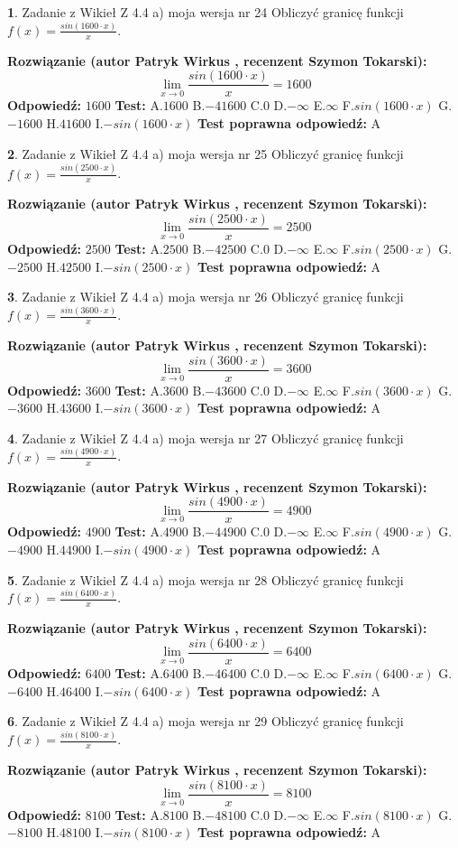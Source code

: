 \documentclass[12pt, a4paper]{article}
\theoremstyle{definition} %
\newtheorem{zad}{}
\newcommand{\zadStart}[1]{\begin{zad}#1\newline}
\newcommand{\zadStop}{\end{zad}}
\newcommand{\rozwStart}[2]{\noindent \textbf{Rozwiązanie (autor #1 , recenzent #2): }\newline}
\newcommand{\rozwStop}{\newline}
\newcommand{\odpStart}{\noindent \textbf{Odpowiedź:}\newline}
\newcommand{\odpStop}{\newline}
\newcommand{\testStart}{\noindent \textbf{Test:}\newline}
\newcommand{\testStop}{\newline}
\newcommand{\kluczStart}{\noindent \textbf{Test poprawna odpowiedź:}\newline}
\newcommand{\kluczStop}{\newline}
\begin{document}
\zadStart{Zadanie z Wikieł Z 4.4 a) moja wersja nr 24}
Obliczyć granicę funkcji $f(x)=\frac{sin(1600\cdot x)}{x}$.
\zadStop
\rozwStart{Patryk Wirkus}{Szymon Tokarski}
$$\lim\limits_{x\to 0}\frac{sin(1600\cdot x)}{x}=
1600$$
\rozwStop
\odpStart
$1600$
\odpStop
\testStart
A.$1600$
B.$-41600$
C.$0$
D.$-\infty$
E.$\infty$
F.$sin(1600\cdot x)$
G.$-1600$
H.$41600$
I.$-sin(1600\cdot x)$
\testStop
\kluczStart
A
\kluczStop



\zadStart{Zadanie z Wikieł Z 4.4 a) moja wersja nr 25}
Obliczyć granicę funkcji $f(x)=\frac{sin(2500\cdot x)}{x}$.
\zadStop
\rozwStart{Patryk Wirkus}{Szymon Tokarski}
$$\lim\limits_{x\to 0}\frac{sin(2500\cdot x)}{x}=
2500$$
\rozwStop
\odpStart
$2500$
\odpStop
\testStart
A.$2500$
B.$-42500$
C.$0$
D.$-\infty$
E.$\infty$
F.$sin(2500\cdot x)$
G.$-2500$
H.$42500$
I.$-sin(2500\cdot x)$
\testStop
\kluczStart
A
\kluczStop



\zadStart{Zadanie z Wikieł Z 4.4 a) moja wersja nr 26}
Obliczyć granicę funkcji $f(x)=\frac{sin(3600\cdot x)}{x}$.
\zadStop
\rozwStart{Patryk Wirkus}{Szymon Tokarski}
$$\lim\limits_{x\to 0}\frac{sin(3600\cdot x)}{x}=
3600$$
\rozwStop
\odpStart
$3600$
\odpStop
\testStart
A.$3600$
B.$-43600$
C.$0$
D.$-\infty$
E.$\infty$
F.$sin(3600\cdot x)$
G.$-3600$
H.$43600$
I.$-sin(3600\cdot x)$
\testStop
\kluczStart
A
\kluczStop



\zadStart{Zadanie z Wikieł Z 4.4 a) moja wersja nr 27}
Obliczyć granicę funkcji $f(x)=\frac{sin(4900\cdot x)}{x}$.
\zadStop
\rozwStart{Patryk Wirkus}{Szymon Tokarski}
$$\lim\limits_{x\to 0}\frac{sin(4900\cdot x)}{x}=
4900$$
\rozwStop
\odpStart
$4900$
\odpStop
\testStart
A.$4900$
B.$-44900$
C.$0$
D.$-\infty$
E.$\infty$
F.$sin(4900\cdot x)$
G.$-4900$
H.$44900$
I.$-sin(4900\cdot x)$
\testStop
\kluczStart
A
\kluczStop



\zadStart{Zadanie z Wikieł Z 4.4 a) moja wersja nr 28}
Obliczyć granicę funkcji $f(x)=\frac{sin(6400\cdot x)}{x}$.
\zadStop
\rozwStart{Patryk Wirkus}{Szymon Tokarski}
$$\lim\limits_{x\to 0}\frac{sin(6400\cdot x)}{x}=
6400$$
\rozwStop
\odpStart
$6400$
\odpStop
\testStart
A.$6400$
B.$-46400$
C.$0$
D.$-\infty$
E.$\infty$
F.$sin(6400\cdot x)$
G.$-6400$
H.$46400$
I.$-sin(6400\cdot x)$
\testStop
\kluczStart
A
\kluczStop



\zadStart{Zadanie z Wikieł Z 4.4 a) moja wersja nr 29}
Obliczyć granicę funkcji $f(x)=\frac{sin(8100\cdot x)}{x}$.
\zadStop
\rozwStart{Patryk Wirkus}{Szymon Tokarski}
$$\lim\limits_{x\to 0}\frac{sin(8100\cdot x)}{x}=
8100$$
\rozwStop
\odpStart
$8100$
\odpStop
\testStart
A.$8100$
B.$-48100$
C.$0$
D.$-\infty$
E.$\infty$
F.$sin(8100\cdot x)$
G.$-8100$
H.$48100$
I.$-sin(8100\cdot x)$
\testStop
\kluczStart
A
\kluczStop
\end{document}
